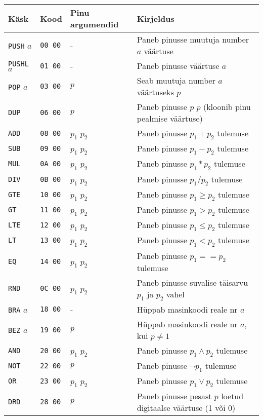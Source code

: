 \begin{longtable}{l|l|l|X}
	Käsk & Kood & Pinu argumendid & Kirjeldus \\
	\hline 
	\endhead
	\texttt{PUSH} $a$ & \texttt{00 00} & - & Paneb pinusse muutuja number $a$ väärtuse \\
	\texttt{PUSHL} $a$ & \texttt{01 00} & - & Paneb pinusse väärtuse $a$ \\
	\texttt{POP} $a$ & \texttt{03 00}  & $p$ & Seab muutuja number $a$ väärtuseks $p$ \\
	\texttt{DUP} & \texttt{06 00} & $p$ & Paneb pinusse $p$ $p$ (kloonib pinu pealmise väärtuse) \\
	\texttt{ADD} & \texttt{08 00} & $p_1$ $p_2$ & Paneb pinusse $p_1 + p_2$ tulemuse \\
	\texttt{SUB} & \texttt{09 00} & $p_1$ $p_2$ & Paneb pinusse $p_1 - p_2$ tulemuse \\
	\texttt{MUL} & \texttt{0A 00} & $p_1$ $p_2$ & Paneb pinusse $p_1 * p_2$ tulemuse \\
	\texttt{DIV} & \texttt{0B 00} & $p_1$ $p_2$ & Paneb pinusse $p_1 / p_2$ tulemuse \\
	\texttt{GTE} & \texttt{10 00} & $p_1$ $p_2$ & Paneb pinusse $p_1 \geq p_2$ tulemuse \\
	\texttt{GT} & \texttt{11 00} & $p_1$ $p_2$ & Paneb pinusse $p_1 > p_2$ tulemuse \\
	\texttt{LTE} & \texttt{12 00} & $p_1$ $p_2$ & Paneb pinusse $p_1 \leq p_2$ tulemuse \\
	\texttt{LT} & \texttt{13 00} & $p_1$ $p_2$ & Paneb pinusse $p_1 < p_2$ tulemuse \\
	\texttt{EQ} & \texttt{14 00} & $p_1$ $p_2$ & Paneb pinusse $p_1 == p_2$ tulemuse \\
	\texttt{RND} & \texttt{0C 00} & $p_1$ $p_2$ & Paneb pinusse suvalise täisarvu $p_1$ ja $p_2$ vahel \\
	\texttt{BRA} $a$ & \texttt{18 00}  & - & Hüppab masinkoodi reale nr $a$ \\
	\texttt{BEZ} $a$ & \texttt{19 00} & $p$ & Hüppab masinkoodi reale nr $a$, kui $p \neq 1$ \\
	\texttt{AND} & \texttt{20 00} & $p_1$ $p_2$ & Paneb pinusse $p_1 \land p_2$ tulemuse \\
	\texttt{NOT} & \texttt{22 00} & $p$ & Paneb pinusse  $\neg p_1$ tulemuse \\
	\texttt{OR} & \texttt{23 00} & $p_1$ $p_2$ & Paneb pinusse $p_1 \lor p_2$ tulemuse \\
	\texttt{DRD} & \texttt{28 00} & $p$ & Paneb pinusse pesast $p$ loetud digitaalse väärtuse (1 või 0) \\

\end{longtable}
